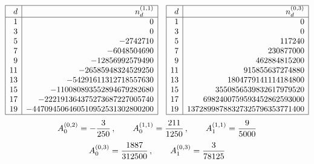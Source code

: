 \medskip

$$
\begin {array} {|r|r|}
\hline
d & n^{(1,1)}_d \\\hline
1  & 0 \\
3  & 0 \\
5  & - 2742710 \\
7  & - 6048504690 \\
9  & - 12856992579490 \\
11 & - 26585948324529250 \\
13 & - 54291611312718557630 \\
15 & - 110080893552894679282680 \\
17 & - 222191364375273687227005740 \\
19 & - 447094506460510952531302800200
\\\hline
\end{array} \quad
\begin{array}{|r|r|}
\hline
d & n^{(0,3)}_d \\\hline
1  &  0 \\
3  &  0 \\
5  & 117240 \\
7  & 230877000 \\
9  & 462884815200 \\
11 & 915855637274880 \\
13 & 1804779141114184800 \\
15 & 3550856539832617979520 \\
17 & 6982400759593452862593000 \\
19 & 13728998788327325796353771400
\\\hline
\end {array}
$$
\bigskip\bigskip
$$ 
A^{(0,2)}_0 = -\frac 3{250}\,,\qquad
A^{(1,1)}_0 = \frac{211}{1250} \,,\qquad
A^{(1,1)}_1 = \frac{9}{5000}
$$
\medskip
$$
A^{(0,3)}_0 = \frac{1887}{312500}\,,\qquad
A^{(0,3)}_1 = \frac{3}{78125}
$$

\newpage

